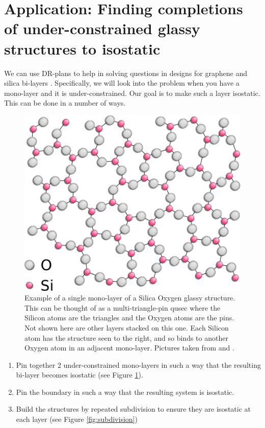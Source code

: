 \section{Application: Finding completions of under-constrained glassy structures to isostatic}
\label{sec:bodypin}
% 

We can use DR-plans to help in solving questions in designs for graphene and silica bi-layers \cite{silica_bilayers} \cite{sructure_of_2d_glass}. Specifically, we will look into the problem when you have a mono-layer and it is under-constrained. Our goal is to make such a layer isostatic. This can be done in a number of ways.

\begin{figure}\centering
    \includegraphics[width=0.4\linewidth]{img/Silica} \hspace{0.5cm}
    \caption{Example of a single mono-layer of a Silica Oxygen glassy structure. This can be thought of as a multi-triangle-pin qusec where the Silicon atoms are the triangles and the Oxygen atoms are the pins. Not shown here are other layers stacked on this one. Each Silicon atom has the structure seen to the right, and so binds to another Oxygen atom in an adjacent mono-layer. Pictures taken from \cite{silica_figure} and \cite{tetra_silica_figure}.}
    \label{fig:silica_glass}
\end{figure}

\begin{enumerate}
    \item Pin together 2 under-constrained mono-layers in such a way that the resulting bi-layer becomes isostatic (see Figure \ref{fig:silica_glass}).
    \item Pin the boundary in such a way that the resulting system is isostatic.
    \item Build the structures by repeated subdivision to ensure they are isostatic at each layer (see Figure \ref{fig:subdivision})
\end{enumerate}

